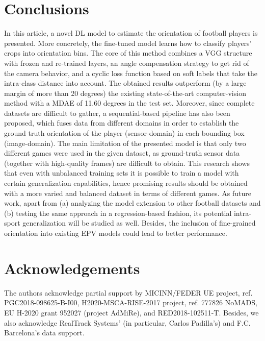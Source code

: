 \documentclass{article}
\begin{document}
\section{Conclusions} \label{sec:conc}
In this article, a novel DL model to estimate the orientation of football players is presented. More concretely, the fine-tuned model learns how to classify players' crops into orientation bins. The core of this method combines a VGG structure with frozen and re-trained layers, an angle compensation strategy to get rid of the camera behavior, and a cyclic loss function based on soft labels that take the intra-class distance into account. The obtained results outperform (by a large margin of more than 20 degrees) the existing state-of-the-art computer-vision method with a MDAE of 11.60 degrees in the test set. Moreover, since complete datasets are difficult to gather, a sequential-based pipeline has also been proposed, which fuses data from different domains in order to establish the ground truth orientation of the player (sensor-domain) in each bounding box (image-domain). 
The main limitation of the presented model is that only two different games were used in the given dataset, as ground-truth sensor data (together with high-quality frames) are difficult to obtain. This research shows that even with unbalanced training sets it is possible to train a model with certain generalization capabilities, hence promising results should be obtained with a more varied and balanced dataset in terms of different games. As future work, apart from (a) analyzing the model extension to other football datasets and (b) testing the same approach in a regression-based fashion, its potential intra-sport generalization will be studied as well. Besides, the inclusion of fine-grained orientation into existing EPV models could lead to better performance. \\ 

\section*{Acknowledgements}
The authors acknowledge partial support by MICINN/FEDER UE project, ref. PGC2018-098625-B-I00, H2020-MSCA-RISE-2017 project, ref. 777826 NoMADS, EU H-2020 grant 952027 (project AdMiRe), and RED2018-102511-T. Besides, we also acknowledge RealTrack Systems' (in particular, Carlos Padilla's) and F.C. Barcelona's data support.
\end{document}
